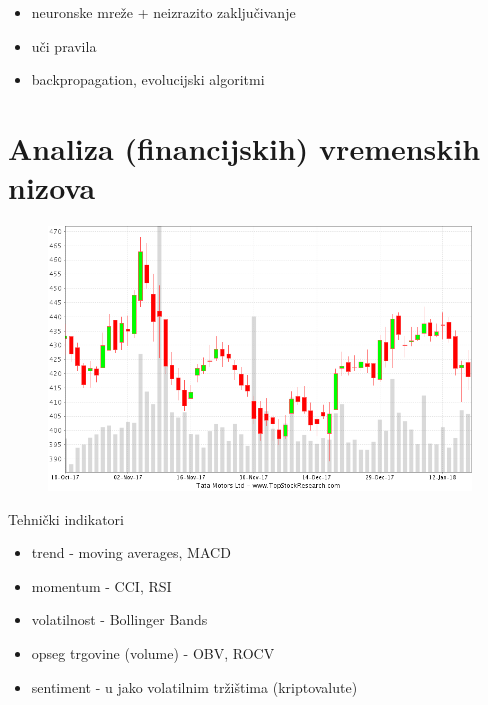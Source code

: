 \documentclass{beamer}
\begin{document}
\begin{frame}{}

\begin{itemize}
  \item neuronske mreže + neizrazito zaključivanje
  \item uči pravila
  \item backpropagation, evolucijski algoritmi
\end{itemize}
\end{frame}

\section{Analiza (financijskih) vremenskih nizova}

\begin{frame}{}
\begin{figure}[h]
  \includegraphics[width=\textwidth]{img/candlestick.png}
\end{figure}
\end{frame}

\begin{frame}{Tehnički indikatori}

\begin{itemize}
  \item trend - moving averages, MACD
  \item momentum - CCI, RSI
  \item volatilnost - Bollinger Bands
  \item opseg trgovine (volume) - OBV, ROCV
  \item sentiment - u jako volatilnim tržištima (kriptovalute)
\end{itemize}
\end{frame}
\end{document}
